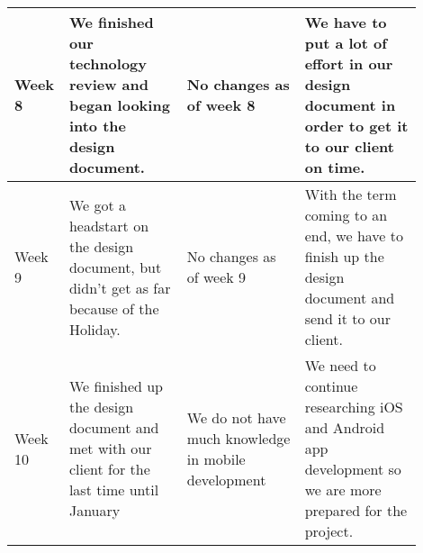 \documentclass[letterpaper,10pt,draftclsnofoot,onecolumn,titlepage]{IEEEtran}
\begin{document}
\begin{table}[H]
\begin{center}
\begin{tabular}{| p{0.06\linewidth} | p{0.28\linewidth} | p{0.28\linewidth} | p{0.28\linewidth} | }
					\hline
					Week 8 & We finished our technology review and began looking into the design document. & No changes as of week 8 & We have to put a lot of effort in our design document in order to get it to our client on time. \\
					\hline
					Week 9 & We got a headstart on the design document, but didn't get as far because of the Holiday. & No changes as of week 9 & With the term coming to an end, we have to finish up the design document and send it to our client. \\
					\hline
					Week 10 & We finished up the design document and met with our client for the last time until January & We do not have much knowledge in mobile development & We need to continue researching iOS and Android app development so we are more prepared for the project. \\
					\hline

				\end{tabular}
			\end{center}
			\end{table}
\end{document}

